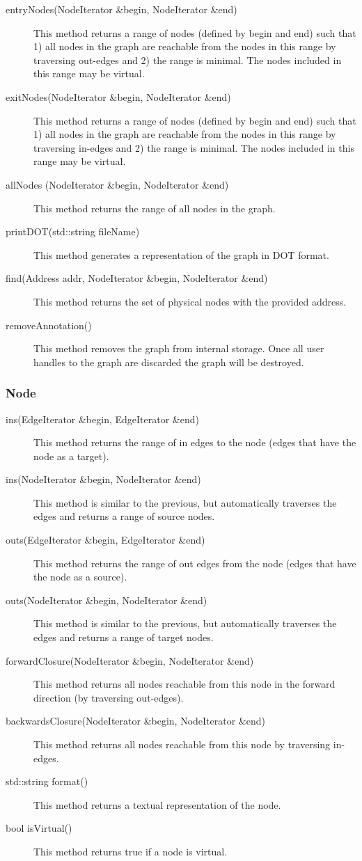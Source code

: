 \documentclass[12pt]{article}
\begin{document}
\begin{description}

\item[entryNodes(NodeIterator \&begin, NodeIterator \&end)] This method returns a range of nodes (defined by begin and end) such that 1) all nodes in the graph are reachable from the nodes in this range by traversing out-edges and 2) the range is minimal. The nodes included in this range may be virtual. 
\item[exitNodes(NodeIterator \&begin, NodeIterator \&end)]
This method returns a range of nodes (defined by begin and end) such that 1) all nodes in the graph are reachable from the nodes in this range by traversing in-edges and 2) the range is minimal. The nodes included in this range may be virtual.
\item[allNodes (NodeIterator \&begin, NodeIterator \&end)]
This method returns the range of all nodes in the graph.
\item[printDOT(std::string fileName)]
This method generates a representation of the graph in DOT format.
\item[find(Address addr, NodeIterator \&begin, NodeIterator \&end)]
This method returns the set of physical nodes with the provided address. 
\item[removeAnnotation()]
This method removes the graph from internal storage. Once all user handles to the graph are discarded the graph will be destroyed.
\end{description}

\subsubsection{Node}

\begin{description}
\item[ins(EdgeIterator \&begin, EdgeIterator \&end)]
This method returns the range of in edges to the node (edges that have the node as a target). 
\item[ins(NodeIterator \&begin, NodeIterator \&end)]
This method is similar to the previous, but automatically traverses the edges and returns a range of source nodes. 
\item[outs(EdgeIterator \&begin, EdgeIterator \&end)]
This method returns the range of out edges from the node (edges that have the node as a source). 
\item[outs(NodeIterator \&begin, NodeIterator \&end)]
This method is similar to the previous, but automatically traverses the edges and returns a range of target nodes.
\item[forwardClosure(NodeIterator \&begin, NodeIterator \&end)]
This method returns all nodes reachable from this node in the forward direction (by traversing out-edges).
\item[backwardsClosure(NodeIterator \&begin, NodeIterator \&end)]
This method returns all nodes reachable from this node by traversing in-edges.
\item[std::string format()]
This method returns a textual representation of the node.
\item[bool isVirtual() ]
This method returns true if a node is virtual.
\end{description}
\end{document}
